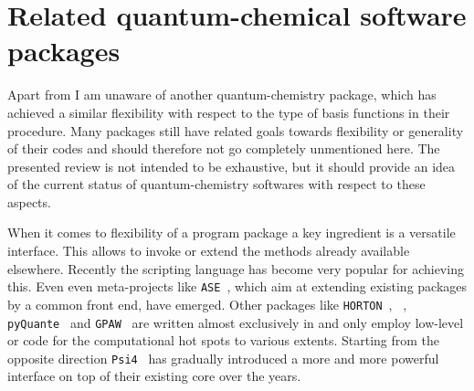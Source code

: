 \section{Related quantum-chemical software packages}
\label{sec:MolsturmRelated}
\newcommand{\psifour}{\texttt{Psi4}\xspace}
\newcommand{\pyquante}{\texttt{pyQuante}\xspace}
\newcommand{\horton}{\texttt{HORTON}\xspace}
\newcommand{\gpaw}{\texttt{GPAW}\xspace}
\newcommand{\ASE}{\texttt{ASE}\xspace}
\newcommand{\CPtK}{\texttt{CP2K}\xspace}

Apart from \molsturm I am unaware of another quantum-chemistry package,
which has achieved
a similar flexibility with respect to the type of basis functions
in their \SCF procedure.
Many packages still have related goals towards flexibility or generality of their codes
and should therefore not go completely unmentioned here.
The presented review is not intended to be exhaustive,
but it should provide an idea of the current status
of quantum-chemistry softwares with respect to these aspects.

When it comes to flexibility of a program package
a key ingredient is a versatile interface.
This allows to invoke or extend the methods already available elsewhere.
Recently the scripting language \python has become very popular
for achieving this.
Even even meta-projects like \ASE~\cite{Larsen2017},
which aim at extending existing packages by a common \python front end,
have emerged.
Other packages like \horton~\cite{Verstraelen2017}, \pyscf~\cite{Sun2017},
\pyquante~\cite{PyQuante} and \gpaw~\cite{Mortensen2005,Enkovaara2010} are written
almost exclusively in \python and only employ low-level \ccc or \cpp
code for the computational hot spots to various extents.
Starting from the opposite direction \psifour~\cite{Parrish2017} has
gradually introduced a more and more powerful \python interface on top of
their existing \cpp core over the years.


